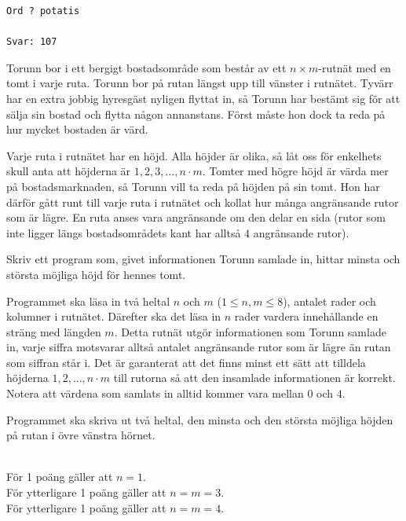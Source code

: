 \vspace{1cm}

\begin{verbatim}
Ord ? potatis

Svar: 107
\end{verbatim}


\newpage
{}


\noindent
Torunn bor i ett bergigt bostadsområde som består av ett $n \times m$-rutnät med en tomt i varje ruta.
Torunn bor på rutan längst upp till vänster i rutnätet.
Tyvärr har en extra jobbig hyresgäst nyligen flyttat in, så Torunn har bestämt sig för att sälja sin bostad och flytta någon annanstans.
Först måste hon dock ta reda på hur mycket bostaden är värd.

Varje ruta i rutnätet har en höjd. Alla höjder är olika, så låt oss för enkelhets skull anta att höjderna är $1, 2, 3, \dots, n\cdot m$.
Tomter med högre höjd är värda mer på bostadsmarknaden, så Torunn vill ta reda på höjden på sin tomt. Hon har därför gått runt till varje ruta i rutnätet och kollat hur många angränsande rutor som är lägre.
En ruta anses vara angränsande om den delar en sida (rutor som inte ligger längs bostadsområdets kant har alltså $4$ angränsande rutor).

Skriv ett program som, givet informationen Torunn samlade in, hittar minsta och största möjliga höjd för hennes tomt.

Programmet ska läsa in två heltal $n$ och $m$ ($1 \leq n,m \leq 8$), antalet rader och kolumner i
rutnätet. Därefter ska det läsa in $n$ rader vardera innehållande en sträng med längden $m$. Detta rutnät utgör informationen
som Torunn samlade in, varje siffra motsvarar alltså antalet angränsande rutor som är lägre än rutan som
siffran står i. Det är garanterat att det finns minst ett sätt att tilldela höjderna 
$1, 2, \dots, n\cdot m$ till rutorna så att den insamlade informationen är korrekt. Notera att värdena
som samlats in alltid kommer vara mellan $0$ och $4$.

Programmet ska skriva ut två heltal, den minsta och den största möjliga höjden på rutan i övre vänstra hörnet.

\\
För 1 poäng gäller att $n = 1$.\\
För ytterligare 1 poäng gäller att $n = m = 3$.\\
För ytterligare 1 poäng gäller att $n = m = 4$.\\

